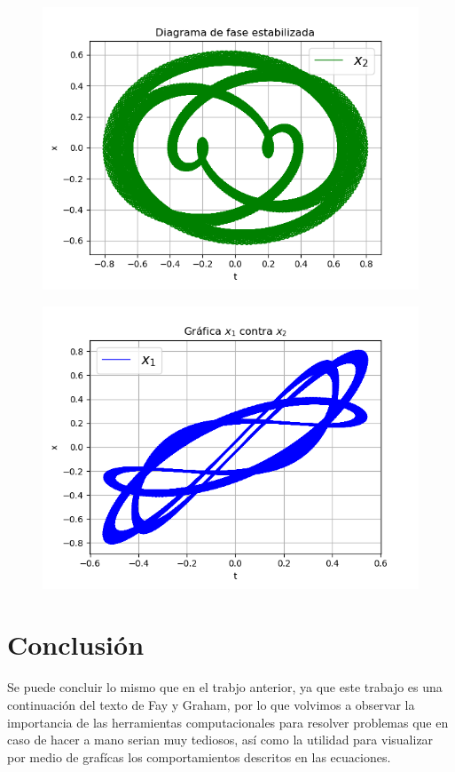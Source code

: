 \documentclass{article}
\begin{document}
\begin{figure}[H]
\centering
\includegraphics[scale=0.59]{41_fe2.png}
\end{figure}

\begin{figure}[H]
\centering
\includegraphics[scale=0.59]{41.png}
\end{figure}

\section{Conclusión}
Se puede concluir lo mismo que en el trabjo anterior, ya que este trabajo es una continuación del texto de Fay y Graham, por lo que volvimos a observar la importancia de las herramientas computacionales para resolver problemas que en caso de hacer a mano serian muy tediosos, así como la utilidad para visualizar por medio de grafícas los comportamientos descritos en las ecuaciones.
\end{document}
